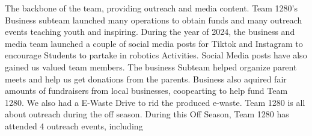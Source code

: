 The backbone of the team, providing outreach and media content. Team 1280's Business subteam launched many operations to obtain funds and many outreach events teaching youth and inspiring. 
During the year of 2024, the business and media team launched a couple of social media posts for Tiktok and Instagram to encourage Students to partake in robotics Activities. Social Media posts have also gained us valued team members. The business Subteam helped organize parent meets and help us get donations from the parents. Business also aquired fair amounts of fundraisers from local businesses, coopearting to help fund Team 1280. We also had a E-Waste Drive to rid the produced e-waste. 
Team 1280 is all about outreach during the off season. During this Off Season, Team 1280 has attended 4 outreach events, including 